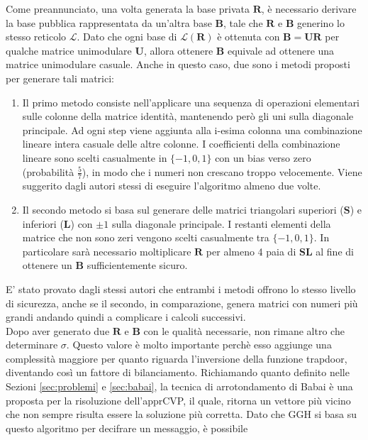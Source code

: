 Come preannunciato, una volta generata la base privata $\mathbf{R}$, è necessario 
derivare la base pubblica rappresentata da un'altra base $\mathbf{B}$, tale che $\mathbf{R}$ 
e $\mathbf{B}$ generino lo stesso reticolo $\mathcal{L}$. Dato che ogni base di 
$\mathcal{L}(\mathbf{R})$ è ottenuta con $\mathbf{B} = \mathbf{U}\mathbf{R}$ per qualche matrice
unimodulare $\mathbf{U}$, allora ottenere $\mathbf{B}$ equivale ad ottenere una matrice
unimodulare casuale. Anche in questo caso, due sono i metodi proposti per generare tali matrici:
\begin{enumerate}
    \item Il primo metodo consiste nell'applicare una sequenza di operazioni elementari 
    sulle colonne della matrice identità, mantenendo però gli uni sulla diagonale principale.
    Ad ogni step viene aggiunta alla i-esima colonna una combinazione lineare intera casuale
    delle altre colonne. I coefficienti della combinazione lineare sono scelti casualmente
    in $\{-1,0,1\}$ con un bias verso zero (probabilità $\frac{5}{7}$), in modo che i numeri non
    crescano troppo velocemente. Viene suggerito dagli autori stessi di eseguire l'algoritmo
    almeno due volte.
    \item Il secondo metodo si basa sul generare delle matrici triangolari superiori 
    ($\mathbf{S}$) e inferiori ($\mathbf{L}$) con $\pm1$ sulla diagonale principale. I 
    restanti elementi della matrice che non sono zeri vengono scelti casualmente tra
    $\{-1,0,1\}$. In particolare sarà necessario moltiplicare $\mathbf{R}$ per almeno 4
    paia di $\mathbf{S}\mathbf{L}$ al fine di ottenere un $\mathbf{B}$ sufficientemente 
    sicuro.
\end{enumerate}
E' stato provato dagli stessi autori che entrambi i metodi offrono lo stesso livello di sicurezza,
anche se il secondo, in comparazione, genera matrici con numeri più grandi andando quindi a 
complicare i calcoli successivi. \\
Dopo aver generato due $\mathbf{R}$ e $\mathbf{B}$ con le qualità necessarie, non
rimane altro che determinare $\sigma$. Questo valore è molto importante perchè esso aggiunge
una complessità maggiore per quanto riguarda l'inversione della funzione trapdoor, diventando
così un fattore di bilanciamento. Richiamando quanto definito nelle Sezioni \ref{sec:problemi}
e \ref{sec:babai}, la tecnica di arrotondamento di Babai è una proposta per la risoluzione 
dell'apprCVP, il quale, ritorna un vettore più vicino che non sempre risulta essere la soluzione più
corretta. Dato che GGH si basa su questo algoritmo per decifrare un messaggio, è possibile
